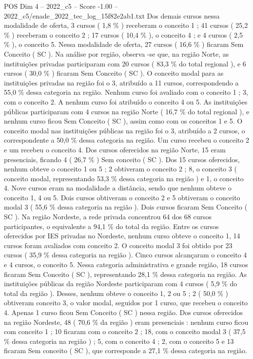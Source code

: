 \begin{textsample}{POS Dim 4 – 2022\_c5 – Score -1.00 – 2022\_c5/enade\_2022\_tec\_log\_15f82e2ab1.txt}
Dos demais cursos nessa modalidade de oferta, 3 cursos ( 1,8 \% ) receberam o conceito 1 ; 41 cursos ( 25,2 \% ) receberam o conceito 2 ; 17 cursos ( 10,4 \% ), o conceito 4 ; e 4 cursos ( 2,5 \% ), o conceito 5.
Nessa modalidade de oferta, 27 cursos ( 16,6 \% ) ficaram Sem Conceito ( SC ).
Na análise por região, observa -se que, na região Norte, as instituições privadas participaram com 20 cursos ( 83,3 \% do total regional ), e 6 cursos ( 30,0 \% ) ficaram Sem Conceito ( SC ).
O conceito modal para as instituições privadas na região foi o 3, atribuído a 11 cursos, correspondendo a 55,0 \% dessa categoria na região.
Nenhum curso foi avaliado com o conceito 1 ; 3, com o conceito 2.
A nenhum curso foi atribuído o conceito 4 ou 5.
As instituições públicas participaram com 4 cursos na região Norte ( 16,7 \% do total regional ), e nenhum curso ficou Sem Conceito ( SC ), assim como com os conceitos 1 e 5.
O conceito modal nas instituições públicas na região foi o 3, atribuído a 2 cursos, o correspondente a 50,0 \% dessa categoria na região.
Um curso recebeu o conceito 2 e um recebeu o conceito 4.
Dos cursos oferecidos na região Norte, 15 eram presenciais, ficando 4 ( 26,7 \% ) Sem conceito ( SC ).
Dos 15 cursos oferecidos, nenhum obteve o conceito 1 ou 5 ; 2 obtiveram o conceito 2 ; 8, o conceito 3 ( conceito modal, representando 53,3 \% dessa categoria na região ) e 1, o conceito 4.
Nove cursos eram na modalidade a distância, sendo que nenhum obteve o conceito 1, 4 ou 5.
Dois cursos obtiveram o conceito 2 e 5 obtiveram o conceito modal 3 ( 55,6 \% dessa categoria na região ).
Dois cursos ficaram Sem Conceito ( SC ).
Na região Nordeste, a rede privada concentrou 64 dos 68 cursos participantes, o equivalente a 94,1 \% do total da região.
Entre os cursos oferecidos por IES privadas no Nordeste, nenhum curso obteve o conceito 1, 14 cursos foram avaliados com conceito 2.
O conceito modal 3 foi obtido por 23 cursos ( 35,9 \% dessa categoria na região ).
Cinco cursos alcançaram o conceito 4 e 4 cursos, o conceito 5.
Nessa categoria administrativa e grande região, 18 cursos ficaram Sem Conceito ( SC ), representando 28,1 \% dessa categoria na região.
As instituições públicas da região Nordeste participaram com 4 cursos ( 5,9 \% do total da região ).
Desses, nenhum obteve o conceito 1, 2 ou 5 ; 2 ( 50,0 \% ) obtiveram conceito 3, o valor modal, seguidos por 1 curso, que recebeu o conceito 4.
Apenas 1 curso ficou Sem Conceito ( SC ) nessa região.
Dos cursos oferecidos na região Nordeste, 48 ( 70,6 \% da região ) eram presenciais : nenhum curso ficou com conceito 1 ; 10 ficaram com o conceito 2 ; 18, com o conceito modal 3 ( 37,5 \% dessa categoria na região ) ; 5, com o conceito 4 ; 2, com o conceito 5 e 13 ficaram Sem conceito ( SC ), que corresponde a 27,1 \% dessa categoria na região.

\end{textsample}
